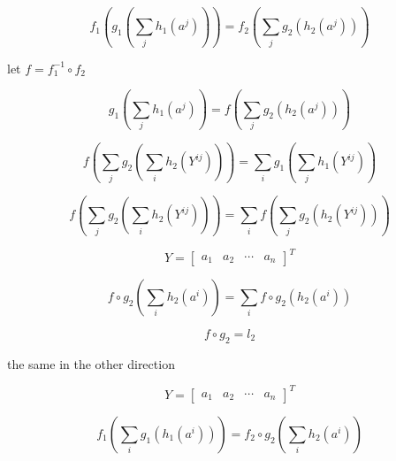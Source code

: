 \documentclass[sn-mathphys-num]{sn-jnl}%
\theoremstyle{thmstyleone}%
\theoremstyle{thmstyletwo}%
\theoremstyle{thmstylethree}%
\begin{document}
\begin{appendices}
\begin{equation}
    f_1 \left( g_1\left( \sum_j h_1(a^j) \right) \right)
    = f_2 \left( \sum_j g_2\left( h_2(a^{j}) \right) \right)
\end{equation}

let $f = f_1^{-1} \circ f_2$

\begin{equation}
     g_1\left( \sum_j h_1(a^j) \right)
    = f \left( \sum_j g_2\left( h_2(a^{j}) \right) \right)
\end{equation}

\begin{equation}
    f \left( \sum_j g_2\left( \sum_i h_2(Y^{ij}) \right) \right)
    = \sum_i g_1\left( \sum_j h_1(Y^{ij}) \right)
\end{equation}

\begin{equation}
    f \left( \sum_j g_2\left( \sum_i h_2(Y^{ij}) \right) \right)
    = \sum_i  f \left( \sum_j g_2\left( h_2(Y^{ij}) \right) \right)
\end{equation}

\begin{equation}
    Y = \begin{bmatrix}
        a_1 & a_2 & \cdots & a_n
    \end{bmatrix}^T
\end{equation}


\begin{equation}
    f \circ  g_2\left( \sum_i h_2(a^{i}) \right)
    = \sum_i  f \circ  g_2\left( h_2(a^{i}) \right)
\end{equation}


\begin{equation}
    f \circ  g_2 = l_2
\end{equation}


the same in the other direction

\begin{equation}
    Y = \begin{bmatrix}
        a_1 & a_2 & \cdots & a_n
    \end{bmatrix}^T
\end{equation}

\begin{equation}
    f_1 \left( \sum_i g_1\left( h_1(a^i) \right) \right)
    = f_2 \circ g_2\left( \sum_ih_2(a^{i}) \right)
\end{equation}


\end{appendices}
\end{document}
